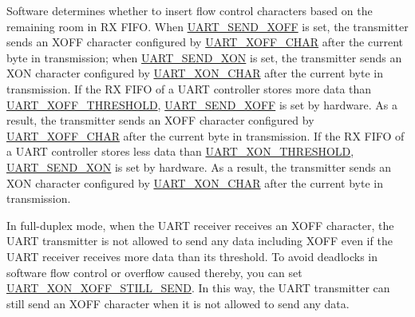 \documentclass[main\_\_EN.tex]{subfiles}
\begin{document}
Software determines whether to insert flow control characters based on the remaining room in RX FIFO. When \hyperref[fielddesc:UARTSENDXOFF]{UART\_SEND\_XOFF} is set, the transmitter sends an XOFF character configured by \hyperref[fielddesc:UARTXOFFCHAR]{UART\_XOFF\_CHAR} after the current byte in transmission; when \hyperref[fielddesc:UARTSENDXON]{UART\_SEND\_XON} is set, the transmitter sends an XON character configured by \hyperref[fielddesc:UARTXONCHAR]{UART\_XON\_CHAR} after the current byte in transmission. If the RX FIFO of a UART controller stores more data than \hyperref[fielddesc:UARTXOFFTHRESHOLD]{UART\_XOFF\_THRESHOLD}, \hyperref[fielddesc:UARTSENDXOFF]{UART\_SEND\_XOFF} is set by hardware. As a result, the transmitter sends an XOFF character configured by \hyperref[fielddesc:UARTXOFFCHAR]{UART\_XOFF\_CHAR} after the current byte in transmission. If the RX FIFO of a UART controller stores less data than \hyperref[fielddesc:UARTXONTHRESHOLD]{UART\_XON\_THRESHOLD}, \hyperref[fielddesc:UARTSENDXON]{UART\_SEND\_XON} is set by hardware. As a result, the transmitter sends an XON character configured by \hyperref[fielddesc:UARTXONCHAR]{UART\_XON\_CHAR} after the current byte in transmission.

In full-duplex mode, when the UART receiver receives an XOFF character, the UART transmitter is not allowed to send any data including XOFF even if the UART receiver receives more data than its threshold. To avoid deadlocks in software flow control or overflow caused thereby, you can set \hyperref[fielddesc:UARTXONXOFFSTILLSEND]{UART\_XON\_XOFF\_STILL\_SEND}. In this way, the UART transmitter can still send an XOFF character when it is not allowed to send any data.
\end{document}
